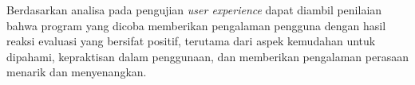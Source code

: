 Berdasarkan analisa pada pengujian \emph{user experience} dapat diambil penilaian bahwa program yang dicoba memberikan pengalaman pengguna dengan hasil reaksi evaluasi yang bersifat positif, terutama dari aspek kemudahan untuk dipahami, kepraktisan dalam penggunaan, dan memberikan pengalaman perasaan menarik dan menyenangkan.
